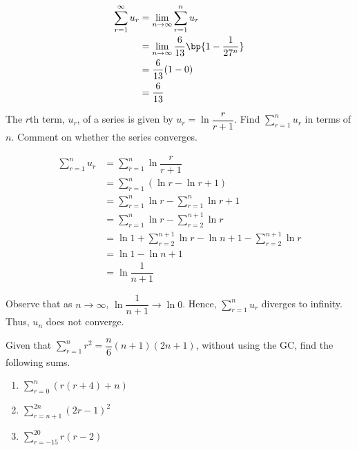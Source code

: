 \documentclass{echw}
\begin{document}

        \begin{align*}
            \sum\limits_{r=1}^\infty u_r &= \lim_{n \to \infty} \sum\limits_{r=1}^n u_r\\
            &= \lim_{n \to \infty} \dfrac{6}{13} \bp{1-\dfrac1{27^n}}\\
            &= \dfrac{6}{13} (1-0)\\
            &= \dfrac6{13}
        \end{align*}


    \problem{}
        The $r$th term, $u_r$, of a series is given by $u_r = \ln \dfrac{r}{r+1}$. Find $\displaystyle\sum\limits_{r=1}^n u_r$ in terms of $n$. Comment on whether the series converges.

    \solution
        \begin{align*}
            \sum\limits_{r=1}^n u_r &= \sum\limits_{r=1}^n \ln \dfrac{r}{r+1}\\
            &= \sum\limits_{r=1}^n (\ln r - \ln{r+1})\\
            &= \sum\limits_{r=1}^n \ln r - \sum\limits_{r=1}^n\ln{r+1}\\
            &= \sum\limits_{r=1}^n \ln r - \sum\limits_{r=2}^{n+1}\ln r\\
            &= \ln 1 + \sum\limits_{r=2}^{n+1} \ln r - \ln{n+1} - \sum\limits_{r=2}^{n+1}\ln r\\
            &= \ln 1 - \ln{n+1}\\
            &= \ln \dfrac1{n+1}
        \end{align*}


        Observe that as $n \to \infty$, $\ln \dfrac1{n+1} \to \ln 0$. Hence, $\displaystyle\sum\limits_{r=1}^n u_r$ diverges to infinity. Thus, $u_n$ does not converge.

    \problem{}
        Given that $\displaystyle\sum\limits_{r=1}^n r^2 = \dfrac{n}6 (n+1)(2n+1)$, without using the GC, find the following sums.

        \begin{enumerate}
            \item $\displaystyle\sum\limits_{r=0}^n (r(r+4) + n)$
            \item $\displaystyle\sum\limits_{r=n+1}^{2n} (2r-1)^2$
            \item $\displaystyle\sum\limits_{r=-15}^{20} r(r-2)$
        \end{enumerate}
\end{document}
